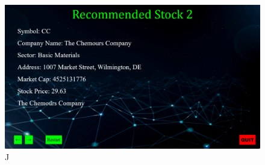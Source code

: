 \documentclass[fontsize=12pt]{article}
\begin{document}
\begin{figure}[!htb]
  \includegraphics[width=\linewidth]{img/j.png}
  \caption{J}\label{fig:awesome_image2}
\endminipage\hfill
\end{figure}
\end{document}
